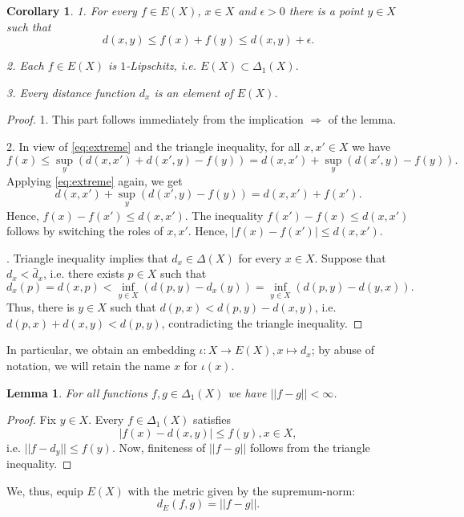 \documentclass[12pt]{amsbook}%
\newtheorem{lem}[thm]{Lemma}
\newtheorem{cor}[thm]{Corollary}
\theoremstyle{definition}
\theoremstyle{remark}
\numberwithin{section}{chapter}
\numberwithin{subsection}{section}
\numberwithin{figure}{chapter}
\def\eps{\epsilon}
\begin{document}
\begin{cor}\label{cor:C1-extreme}
1. For every $f\in E(X)$, $x\in X$ and $\eps>0$ 
there is a point $y\in X$  such that
$$
d(x,y) \leqslant f(x)+ f(y)\leqslant d(x,y)+\eps. 
$$

2. Each $f\in E(X)$ is $1$-Lipschitz, i.e. $E(X)\subset \Delta_1(X)$. 

3.   Every distance function $d_x$ is an element of $E(X)$.
\end{cor}
\begin{proof} 1. This part follows immediately from the implication $\Rightarrow$ of the lemma. 

2. In view of \eqref{eq:extreme} and the triangle inequality, for all $x, x'\in X$ we have 
$$
f(x)\leqslant \sup_y (d(x,x') + d(x',y) - f(y))= d(x,x') +  \sup_y (d(x',y) - f(y)). 
$$
Applying \eqref{eq:extreme} again, we get
$$
d(x,x') +  \sup_y (d(x',y) - f(y)) = d(x,x') + f(x').
$$
Hence, $f(x)-f(x')\leqslant d(x,x')$. The inequality $f(x')-f(x)\leqslant d(x,x')$ follows by switching the roles of $x, x'$. Hence, $|f(x)-f(x')|\leqslant d(x,x')$. 

. Triangle inequality implies that $d_x\in \Delta(X)$ for every $x\in X$. Suppose that $d_x< \bar{d}_x$, i.e. there exists $p\in X$ such that 
$$
d_x(p)=d(x,p)< \inf_{y\in X} (d(p,y) - d_x(y))= \inf_{y\in X} (d(p,y) - d(y,x)).
$$
Thus, there is $y\in X$ such that $d(p,x)< d(p,y)- d(x,y)$, i.e. $d(p, x) + d(x,y)< d(p,y)$, contradicting the triangle inequality. 
\end{proof}

In particular, we obtain an embedding $\iota: X\to E(X), x\mapsto d_x$; by abuse of notation, we will retain the name $x$ for $\iota(x)$. 


\begin{lem}
For all functions $f, g\in \Delta_1(X)$ we have $||f-g||<\infty$. 
\end{lem}
\begin{proof} Fix $y\in X$. Every  $f\in \Delta_1(X)$ satisfies  
$$
|f(x)-d(x,y)|\leqslant f(y), x\in X, 
$$
i.e. $||f-d_y||\leqslant f(y)$. Now, finiteness of $||f-g||$ follows from the triangle inequality. 
\end{proof}

We, thus, equip $E(X)$ with the metric given by the supremum-norm: 
$$
d_E(f, g)=||f-g||. 
$$
\end{document}

